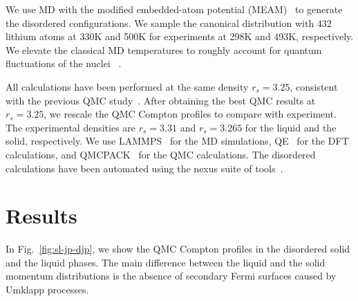 \documentclass[aps,prb,showpacs,preprintnumbers,amsmath,amssymb,superscriptaddress,twocolumn]{revtex4}
\begin{document}
We use MD with the modified embedded-atom potential (MEAM)~\cite{Baskes1992} to generate the disordered configurations. We sample the canonical distribution with 432 lithium atoms at 330K and 500K for experiments at 298K and 493K, respectively. We elevate the classical MD temperatures to roughly account for quantum fluctuations of the nuclei ~\cite{Filippi1998}.

All calculations have been performed at the same density $r_s=3.25$, consistent with the previous QMC study~\cite{Filippi1999}. After obtaining the best QMC results at $r_s=3.25$, we rescale the QMC Compton profiles to compare with experiment. The experimental densities are $r_s=3.31$ and $r_s=3.265$ for the liquid and the solid, respectively.
We use LAMMPS~\cite{Plimpton1993} for the MD simulations, QE~\cite{Giannozzi2009,Enkovaara2017} for the DFT calculations, and QMCPACK~\cite{Kim2018} for the QMC calculations. The disordered calculations have been automated using the nexus suite of tools~\cite{Krogel2016}.

\section{Results} \label{sec:results}

In Fig.~\ref{fig:sl-jp-djp}, we show the QMC Compton profiles in the disordered solid and the liquid phases. The main difference between the liquid and the solid momentum distributions is the absence of secondary Fermi surfaces caused by Umklapp processes.
\end{document}
